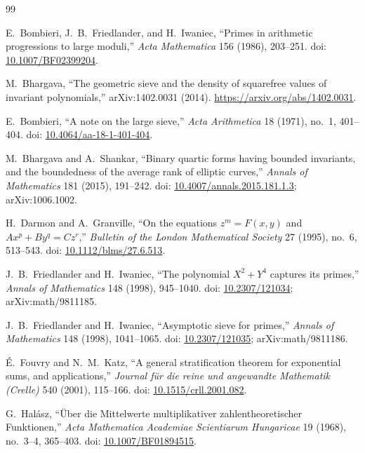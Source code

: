 \documentclass[11pt,a4paper]{article}
\begin{document}
\begingroup
\small
\setlength{\itemsep}{0pt}
\setlength{\parskip}{0pt}
\setlength{\parsep}{0pt}
\begin{thebibliography}{99}

E.~Bombieri, J.~B.~Friedlander, and H.~Iwaniec, ``Primes in arithmetic
progressions to large moduli,''
\emph{Acta Mathematica} 156 (1986), 203--251. doi:
\href{https://doi.org/10.1007/BF02399204}{10.1007/BF02399204}.

M.~Bhargava, ``The geometric sieve and the density of squarefree values
of invariant polynomials,'' arXiv:1402.0031 (2014).
\url{https://arxiv.org/abs/1402.0031}.

E.~Bombieri, ``A note on the large sieve,''
\emph{Acta Arithmetica} 18 (1971), no.\ 1, 401--404. doi:
\href{https://doi.org/10.4064/aa-18-1-401-404}{10.4064/aa-18-1-401-404}.

M.~Bhargava and A.~Shankar, ``Binary quartic forms having bounded
invariants, and the boundedness of the average rank of elliptic
curves,'' \emph{Annals of Mathematics} 181 (2015), 191--242.
doi: \href{https://doi.org/10.4007/annals.2015.181.1.3}{10.4007/annals.2015.181.1.3};
arXiv:1006.1002.

H.~Darmon and A.~Granville, ``On the equations $z^m=F(x,y)$ and
$Ax^p+By^q=Cz^r$,''
\emph{Bulletin of the London Mathematical Society} 27 (1995),
no.\ 6, 513--543. doi:
\href{https://doi.org/10.1112/blms/27.6.513}{10.1112/blms/27.6.513}.

J.~B.~Friedlander and H.~Iwaniec, ``The polynomial $X^2+Y^4$ captures
its primes,'' \emph{Annals of Mathematics} 148 (1998), 945--1040.
doi: \href{https://doi.org/10.2307/121034}{10.2307/121034};
arXiv:math/9811185.

J.~B.~Friedlander and H.~Iwaniec, ``Asymptotic sieve for primes,''
\emph{Annals of Mathematics} 148 (1998), 1041--1065.
doi: \href{https://doi.org/10.2307/121035}{10.2307/121035};
arXiv:math/9811186.

\'E.~Fouvry and N.~M.~Katz, ``A general stratification theorem for
exponential sums, and applications,''
\emph{Journal f\"ur die reine und angewandte Mathematik (Crelle)}
540 (2001), 115--166. doi:
\href{https://doi.org/10.1515/crll.2001.082}{10.1515/crll.2001.082}.

G.~Hal\'asz, ``\"Uber die Mittelwerte multiplikativer zahlentheoretischer
Funktionen,'' \emph{Acta Mathematica Academiae Scientiarum Hungaricae}
19 (1968), no.\ 3--4, 365--403. doi:
\href{https://doi.org/10.1007/BF01894515}{10.1007/BF01894515}.


\end{thebibliography}
\end{document}
